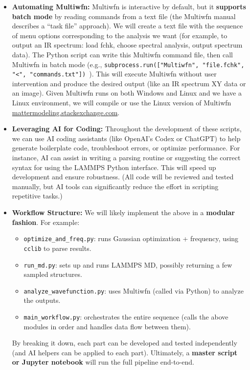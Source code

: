 \documentclass[11pt]{article}
\begin{document}
\begin{itemize}
  \item \textbf{Automating Multiwfn:} Multiwfn is interactive by default, but it \textbf{supports batch mode} by reading commands from a text file (the Multiwfn manual describes a “task file” approach). We will create a text file with the sequence of menu options corresponding to the analysis we want (for example, to output an IR spectrum: load fchk, choose spectral analysis, output spectrum data). The Python script can write this Multiwfn command file, then call Multiwfn in batch mode (e.g., \texttt{subprocess.run(["Multiwfn", "file.fchk", "<", "commands.txt"]) }). This will execute Multiwfn without user intervention and produce the desired output (like an IR spectrum XY data or an image). Given Multiwfn runs on both Windows and Linux and we have a Linux environment, we will compile or use the Linux version of Multiwfn\,\href{https://mattermodeling.stackexchange.com/questions/3493/quantifying-electronic-overlap\#:\~:text=I\%20recommend\%20the\%20use\%20of,function\%20calculated\%20from\%20other\%20software}{mattermodeling.stackexchange.com}.
  \item \textbf{Leveraging AI for Coding:} Throughout the development of these scripts, we can use AI coding assistants (like OpenAI’s Codex or ChatGPT) to help generate boilerplate code, troubleshoot errors, or optimize performance. For instance, AI can assist in writing a parsing routine or suggesting the correct syntax for using the LAMMPS Python interface. This will speed up development and ensure robustness. (All code will be reviewed and tested manually, but AI tools can significantly reduce the effort in scripting repetitive tasks.)
  \item \textbf{Workflow Structure:} We will likely implement the above in a \textbf{modular fashion}. For example:
  \begin{itemize}
    \item \texttt{optimize\_and\_freq.py}: runs Gaussian optimization + frequency, using \texttt{cclib} to parse results.
    \item \texttt{run\_md.py}: sets up and runs LAMMPS MD, possibly returning a few sampled structures.
    \item \texttt{analyze\_wavefunction.py}: uses Multiwfn (called via Python) to analyze the outputs.
    \item \texttt{main\_workflow.py}: orchestrates the entire sequence (calls the above modules in order and handles data flow between them).
  \end{itemize}
  By breaking it down, each part can be developed and tested independently (and AI helpers can be applied to each part). Ultimately, a \textbf{master script or Jupyter notebook} will run the full pipeline end-to-end.
\end{itemize}
\end{document}
